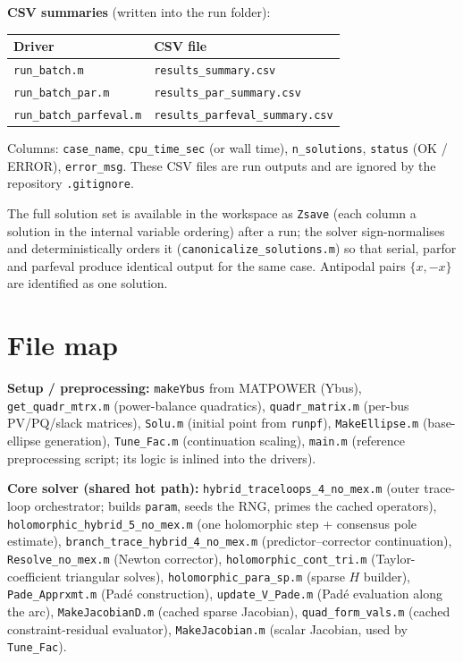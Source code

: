 \documentclass[11pt,a4paper]{article}
\newcommand{\code}[1]{\texttt{#1}}
\begin{document}
\textbf{CSV summaries} (written into the run folder):
\begin{center}\small
\begin{tabular}{@{}ll@{}}
\toprule
Driver & CSV file\\
\midrule
\code{run_batch.m}          & \code{results_summary.csv}\\
\code{run_batch_par.m}      & \code{results_par_summary.csv}\\
\code{run_batch_parfeval.m} & \code{results_parfeval_summary.csv}\\
\bottomrule
\end{tabular}
\end{center}
Columns: \code{case_name}, \code{cpu_time_sec} (or wall time), \code{n_solutions},
\code{status} (OK / ERROR), \code{error_msg}.
These CSV files are run outputs and are ignored by the repository \code{.gitignore}.

The full solution set is available in the workspace as \code{Zsave} (each column a
solution in the internal variable ordering) after a run; the solver sign-normalises and
deterministically orders it (\code{canonicalize_solutions.m}) so that serial, parfor and
parfeval produce identical output for the same case. Antipodal pairs $\{x,-x\}$ are
identified as one solution.

\section{File map}

\textbf{Setup / preprocessing:}
\code{makeYbus} from MATPOWER (Ybus), \code{get_quadr_mtrx.m} (power-balance quadratics),
\code{quadr_matrix.m} (per-bus PV/PQ/slack matrices), \code{Solu.m} (initial point from
\code{runpf}), \code{MakeEllipse.m} (base-ellipse generation), \code{Tune_Fac.m}
(continuation scaling), \code{main.m} (reference preprocessing script; its logic is
inlined into the drivers).

\textbf{Core solver (shared hot path):}
\code{hybrid_traceloops_4_no_mex.m} (outer trace-loop orchestrator; builds \code{param},
seeds the RNG, primes the cached operators), \code{holomorphic_hybrid_5_no_mex.m} (one
holomorphic step + consensus pole estimate), \code{branch_trace_hybrid_4_no_mex.m}
(predictor--corrector continuation), \code{Resolve_no_mex.m} (Newton corrector),
\code{holomorphic_cont_tri.m} (Taylor-coefficient triangular solves),
\code{holomorphic_para_sp.m} (sparse $H$ builder), \code{Pade_Apprxmt.m} (Pad\'e
construction), \code{update_V_Pade.m} (Pad\'e evaluation along the arc),
\code{MakeJacobianD.m} (cached sparse Jacobian), \code{quad_form_vals.m} (cached
constraint-residual evaluator), \code{MakeJacobian.m} (scalar Jacobian, used by
\code{Tune_Fac}).
\end{document}
